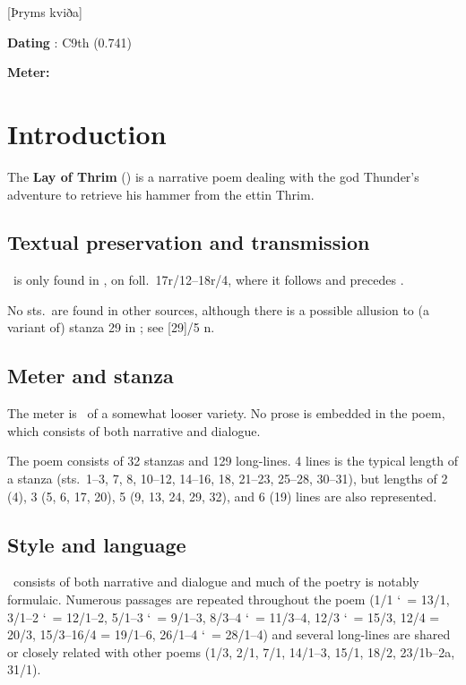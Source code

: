 [Þryms kviða]

\begin{flushright}%
\textbf{Dating} \parencite{Sapp2022}: C9th (0.741)

\textbf{Meter:} \Fornyrdislag%
\end{flushright}

\section{Introduction}

The \textbf{Lay of Thrim} (\Thrymskvida) is a narrative poem dealing with the god Thunder’s adventure to retrieve his hammer from the ettin Thrim.

\subsection{Textual preservation and transmission}

\Thrymskvida\ is only found in \Regius, on foll.~17r/12--18r/4, where it follows  and precedes .

No sts.~are found in other sources, although there is a possible allusion to (a variant of) stanza 29 in \Gylfaginning; see [29]/5 n.

\subsection{Meter and stanza}

The meter is \Fornyrdislag\ of a somewhat looser variety.  No prose is embedded in the poem, which consists of both narrative and dialogue.

The poem consists of 32 stanzas and 129 long-lines.  4 lines is the typical length of a stanza (sts.~1--3, 7, 8, 10--12, 14--16, 18, 21--23, 25--28, 30--31), but lengths of 2 (4), 3 (5, 6, 17, 20), 5 (9, 13, 24, 29, 32), and 6 (19) lines are also represented.

\subsection{Style and language}

\Thrymskvida\ consists of both narrative and dialogue and much of the poetry is notably formulaic.  Numerous passages are repeated throughout the poem (1/1 \char`~= 13/1, 3/1--2 \char`~= 12/1--2, 5/1--3 \char`~= 9/1--3, 8/3--4 \char`~= 11/3--4, 12/3 \char`~= 15/3, 12/4 = 20/3, 15/3--16/4 = 19/1--6, 26/1--4 \char`~= 28/1--4) and several long-lines are shared or closely related with other poems (1/3, 2/1, 7/1, 14/1--3, 15/1, 18/2, 23/1b--2a, 31/1).

